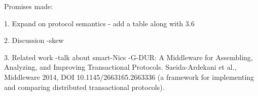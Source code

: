 Promises made:



1. Expand on protocol semantics
- add a table along with 3.6

2. Discussion
-skew

3. Related work
-talk about smart-Nics
-G-DUR: A Middleware for Assembling, Analyzing, and Improving Transactional Protocols. Saeida-Ardekani et al., Middleware 2014, DOI 10.1145/2663165.2663336 (a framework for implementing and comparing distributed transactional protocols).